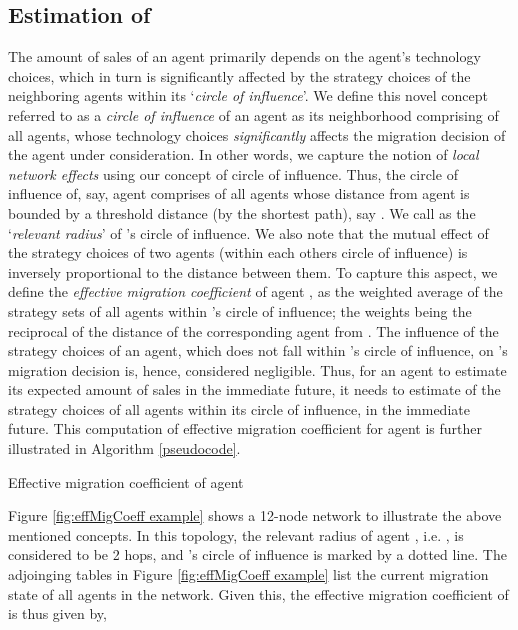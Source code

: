 \documentclass[smallextended]{svjour3}
\begin{document}
\subsection{Estimation of } \label{sec:estimation approaches}
The amount of sales of an agent primarily depends on the agent's technology
choices, which in turn is significantly affected by the strategy choices of the
neighboring agents within its `\emph{circle of influence}'. We define this
novel concept referred to as a \emph{circle of influence} of an agent as its
neighborhood comprising of all agents, whose technology choices
\emph{significantly} affects the migration decision of the agent under
consideration. In other words, we capture the notion of \emph{local network
effects} \cite{localNetworkEffects} using our concept of circle of influence.
Thus, the circle of influence of, say, agent  comprises of all agents whose
distance from agent  is bounded by a threshold distance (by the shortest
path), say .
We call  as the `\emph{relevant radius}' of 's circle of
influence. We also note that the mutual effect of the strategy choices of two
agents (within each others circle of influence) is inversely proportional to the
distance between them. To capture this aspect, we define the \emph{effective
migration coefficient} of agent , as the weighted average of the strategy
sets of all agents within 's circle of influence; the weights being the
reciprocal of the distance of the corresponding agent from .
The influence of the strategy choices of an agent, which does not fall within
's circle of influence, on 's migration decision is, hence, considered
negligible. Thus, for an agent to estimate its expected amount of sales in the
immediate future, it needs to estimate of the strategy choices of all agents
within its circle of influence, in the immediate future. This computation of
effective migration coefficient for agent  is further illustrated in Algorithm \ref{pseudocode}.

\begin{algorithm}
\caption{Effective migration coefficient of agent }
\label{pseudocode}
\begin{algorithmic}
	\IF {}
		\IF {}
			\STATE {}
		\ENDIF
	\ENDIF
\ENDFOR
{}
\end{algorithmic}
\end{algorithm}

Figure \ref{fig:effMigCoeff example} shows a 12-node network to illustrate the
above mentioned concepts. In this topology, the relevant radius of agent ,
i.e. , is considered to be 2 hops, and 's circle of influence
is marked by a dotted line. The adjoinging tables in Figure
\ref{fig:effMigCoeff example} list the current migration state of all agents
in the network. Given this, the effective migration coefficient of  is
thus given by,
\end{document}
